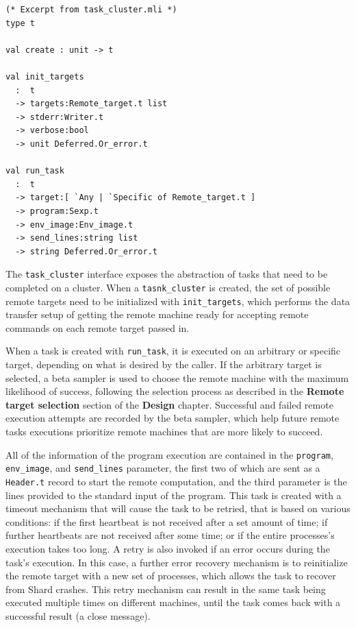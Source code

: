 \documentclass[twoside]{report}
\begin{document}
\begin{minipage}[c]{\textwidth-15pt}
  \begin{lstlisting}
(* Excerpt from task_cluster.mli *)
type t

val create : unit -> t

val init_targets
  :  t
  -> targets:Remote_target.t list
  -> stderr:Writer.t
  -> verbose:bool
  -> unit Deferred.Or_error.t

val run_task
  :  t
  -> target:[ `Any | `Specific of Remote_target.t ]
  -> program:Sexp.t
  -> env_image:Env_image.t
  -> send_lines:string list
  -> string Deferred.Or_error.t
\end{lstlisting}
  \smallskip
\end{minipage}

The \texttt{task\_cluster} interface exposes the abstraction of tasks that need to be completed on a cluster.
When a \texttt{tasnk\_cluster} is created, the set of possible remote targets need to be initialized with \texttt{init\_targets}, which performs the data transfer setup of getting the remote machine ready for accepting remote commands on each remote target passed in.

When a task is created with \texttt{run\_task}, it is executed on an arbitrary or specific target, depending on what is desired by the caller.
If the arbitrary target is selected, a beta sampler is used to choose the remote machine with the maximum likelihood of success, following the selection process as described in the \textbf{Remote target selection} section of the \textbf{Design} chapter.
Successful and failed remote execution attempts are recorded by the beta sampler, which help future remote tasks executions prioritize remote machines that are more likely to succeed.

All of the information of the program execution are contained in the \texttt{program}, \texttt{env\_image}, and \texttt{send\_lines} parameter, the first two of which are sent as a \texttt{Header.t} record to start the remote computation, and the third parameter is the lines provided to the standard input of the program.
This task is created with a timeout mechanism that will cause the task to be retried, that is based on various conditions: if the first heartbeat is not received after a set amount of time; if further heartbeats are not received after some time; or if the entire processes's execution takes too long.
A retry is also invoked if an error occurs during the task's execution.
In this case, a further error recovery mechanism is to reinitialize the remote target with a new set of processes, which allows the task to recover from Shard crashes.
This retry mechanism can result in the same task being executed multiple times on different machines, until the task comes back with a successful result (a close message).
\end{document}
